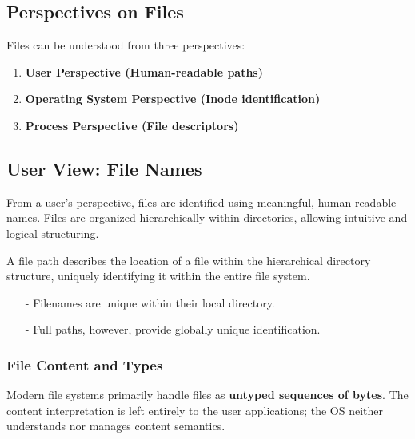 \subsection{Perspectives on Files}
Files can be understood from three perspectives:
\begin{enumerate}
    \item \textbf{User Perspective (Human-readable paths)}
    \item \textbf{Operating System Perspective (Inode identification)}
    \item \textbf{Process Perspective (File descriptors)}
\end{enumerate}
\newpage

\subsection{User View: File Names}
From a user's perspective, files are identified using meaningful, human-readable names. Files are organized hierarchically within directories, allowing intuitive and logical structuring.\\[5px]
\begin{definition}
A file path describes the location of a file within the hierarchical directory structure, uniquely identifying it within the entire file system.
\begin{itemize}
    \item[-] Filenames are unique within their local directory.
    \item[-] Full paths, however, provide globally unique identification.
\end{itemize}
\end{definition}

\subsubsection{File Content and Types}
Modern file systems primarily handle files as \textbf{untyped sequences of bytes}. The content interpretation is left entirely to the user applications; the OS neither understands nor manages content semantics.

